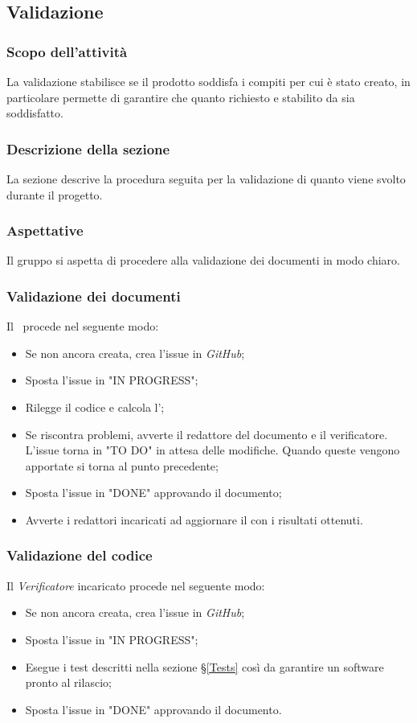 \subsection{Validazione}\label{PSup_Validazione}
\subsubsection{Scopo dell'attività}\label{PSup_Validazione_Scopo}
La validazione stabilisce se il prodotto soddisfa i compiti per cui è stato creato, in particolare permette di garantire che quanto richiesto e stabilito da \Proponente sia soddisfatto.

\subsubsection{Descrizione della sezione} 
La sezione descrive la procedura seguita per la validazione di quanto viene svolto durante il progetto.

\subsubsection{Aspettative}
Il gruppo si aspetta di procedere alla validazione dei documenti in modo chiaro. 

\subsubsection{Validazione dei documenti}\label{ValidazioneDoc}
Il \Responsabile\ procede nel seguente modo:
\begin{itemize}
	\item Se non ancora creata, crea l'issue in \textit{GitHub};
	\item Sposta l'issue in "IN PROGRESS";
	\item Rilegge il codice e calcola l';
	\item Se riscontra problemi, avverte il redattore del documento e il verificatore. L'issue torna in "TO DO" in attesa delle modifiche. Quando queste vengono apportate si torna al punto precedente;
	\item Sposta l'issue in "DONE" approvando il documento;
	\item Avverte i redattori incaricati ad aggiornare il \PdQv{} con i risultati ottenuti.
\end{itemize}

\subsubsection{Validazione del codice}\label{ValidazioneCodice}
Il \textit{Verificatore} incaricato procede nel seguente modo:
\begin{itemize}
	\item Se non ancora creata, crea l'issue in \textit{GitHub};
	\item Sposta l'issue in "IN PROGRESS";
	\item Esegue i test descritti nella sezione \S\ref{Tests} così da garantire un software pronto al rilascio;
	\item Sposta l'issue in "DONE" approvando il documento.
\end{itemize}

